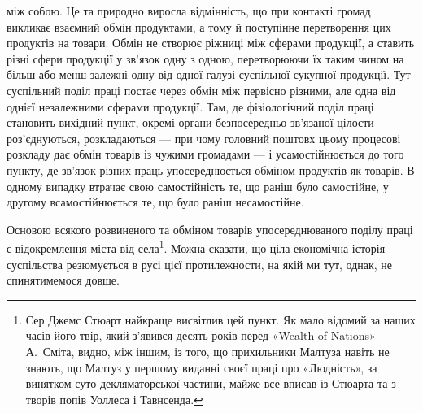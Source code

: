 \parcont{}  %
між собою. Це та природно виросла відмінність, що при контакті
громад викликає взаємний обмін продуктами, а тому й поступінне
перетворення цих продуктів на товари. Обмін не створює ріжниці
між сферами продукції, а ставить різні сфери продукції у зв’язок
одну з одною, перетворюючи їх таким чином на більш або менш
залежні одну від одної галузі суспільної сукупної продукції.
Тут суспільний поділ праці постає через обмін між первісно різними,
але одна від однієї незалежними сферами продукції. Там,
де фізіологічний поділ праці становить вихідний пункт, окремі
органи безпосередньо зв’язаної цілости роз’єднуються, розкладаються
— при чому головний поштовх цьому процесові розкладу
дає обмін товарів із чужими громадами — і усамостійнюється
до того пункту, де зв’язок різних праць упосереднюється обміном
продуктів як товарів. В одному випадку втрачає свою самостійність
те, що раніш було самостійне, у другому всамостійнюється
те, що було раніш несамостійне.

Основою всякого розвиненого та обміном товарів упосереднюваного
поділу праці є відокремлення міста від села\footnote{
Сер Джемс Стюарт найкраще висвітлив цей пункт. Як мало відомий
за наших часів його твір, який з’явився десять років перед «Wealth
of Nations» А.~Сміта, видно, між іншим, із того, що прихильники
Малтуза навіть не знають, що Малтуз у першому виданні своєї праці
про «Людність», за винятком суто декляматорської частини, майже все
вписав із Стюарта та з творів попів Уоллеса і Тавнсенда.
}. Можна
сказати, що ціла економічна історія суспільства резюмується
в русі цієї протилежности, на якій ми тут, однак, не спинятимемося
довше.

